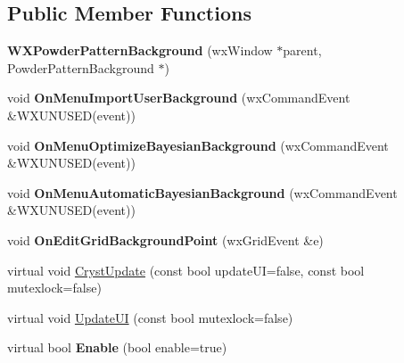 \subsection*{Public Member Functions}
\begin{DoxyCompactItemize}
\item 
\mbox{\label{class_obj_cryst_1_1_w_x_powder_pattern_background_ac1e2248aaf23ec7e0dcf590dee1c8c3b}} 
{\bfseries W\+X\+Powder\+Pattern\+Background} (wx\+Window $\ast$parent, Powder\+Pattern\+Background $\ast$)
\item 
\mbox{\label{class_obj_cryst_1_1_w_x_powder_pattern_background_a443d015900a9454dd455d453368ebbaf}} 
void {\bfseries On\+Menu\+Import\+User\+Background} (wx\+Command\+Event \&W\+X\+U\+N\+U\+S\+ED(event))
\item 
\mbox{\label{class_obj_cryst_1_1_w_x_powder_pattern_background_a4b6467ecf5d9582dec4e38aa823a70b5}} 
void {\bfseries On\+Menu\+Optimize\+Bayesian\+Background} (wx\+Command\+Event \&W\+X\+U\+N\+U\+S\+ED(event))
\item 
\mbox{\label{class_obj_cryst_1_1_w_x_powder_pattern_background_ab820827154f0613b00a5c1b33c8205d1}} 
void {\bfseries On\+Menu\+Automatic\+Bayesian\+Background} (wx\+Command\+Event \&W\+X\+U\+N\+U\+S\+ED(event))
\item 
\mbox{\label{class_obj_cryst_1_1_w_x_powder_pattern_background_af656d56a926a2526d9b9f8519e5edc78}} 
void {\bfseries On\+Edit\+Grid\+Background\+Point} (wx\+Grid\+Event \&e)
\item 
virtual void \mbox{\hyperlink{class_obj_cryst_1_1_w_x_powder_pattern_background_a88a6987f3747b2538572e91f04b8f08d}{Cryst\+Update}} (const bool update\+UI=false, const bool mutexlock=false)
\item 
virtual void \mbox{\hyperlink{class_obj_cryst_1_1_w_x_powder_pattern_background_a7e54d0ef518f44f897d7363e7f96e4ae}{Update\+UI}} (const bool mutexlock=false)
\item 
\mbox{\label{class_obj_cryst_1_1_w_x_powder_pattern_background_a9841f89ec3056cb687096389b42035ec}} 
virtual bool {\bfseries Enable} (bool enable=true)
\end{DoxyCompactItemize}
